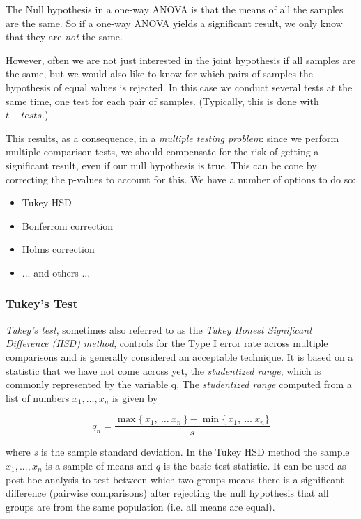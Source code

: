 The Null hypothesis in a one-way ANOVA is that the means of all the samples are the same. So if a one-way ANOVA yields a significant result, we only know that they are \emph{not} the same.

However, often we are not just interested in the joint hypothesis if all samples are the same, but we would also like to know for which pairs of samples the hypothesis of equal values is rejected. In this case we conduct several tests at the same time, one test for each pair of samples. (Typically, this is done with $t-tests$.)

This results, as a consequence, in a \emph{multiple testing problem}:
since we perform multiple comparison tests, we should compensate for the risk of getting a significant result, even if our null hypothesis is true. This can be cone by correcting the p-values to account for this. We have a number of options to do so:

\begin{itemize}
  \item Tukey HSD
  \item Bonferroni correction
  \item Holms correction
  \item ... and others ...
\end{itemize}


\subsubsection{Tukey's Test}

\emph{Tukey's test}, sometimes also referred to as the \emph{Tukey Honest Significant Difference (HSD) method}, controls for the Type I error rate across multiple comparisons and is generally considered an acceptable technique. It is based on a
statistic that we have not come across yet, the \emph{studentized range}, which is commonly represented by the variable q. The \emph{studentized range} computed from a list of numbers $x_1, ..., x_n$ is given by

\begin{equation}
  q _{n}= \frac{\max\{\,x_1,\ \dots \ x_n\,\} - \min\{\,x_1,\ \dots\ x_n\}}{s}
\end{equation}

where \emph{s} is the sample standard deviation.
In the Tukey HSD method the sample $x_1, ..., x_n$ is a sample of means and $q$ is the basic test-statistic. It can be used as post-hoc analysis to test between which two groups means there is a significant difference (pairwise comparisons) after rejecting the null hypothesis that all groups are from the same population (i.e. all means are equal).

